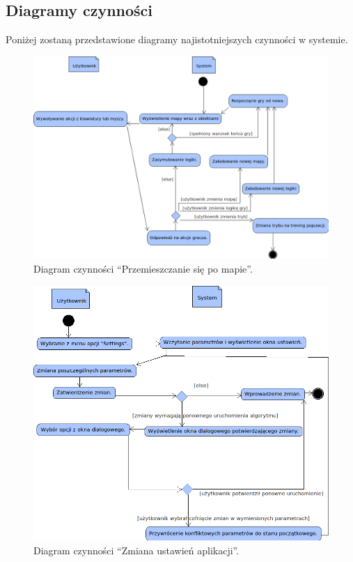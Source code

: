 \subsection{Diagramy czynności}
\begin{par}
		Poniżej zostaną przedstawione diagramy najistotniejszych czynności w systemie.
		\begin{figure}[!h]
		\centering
		\includegraphics[width=\textwidth]{obrazki/activity_diagram.png}
		\caption{Diagram czynności ``Przemieszczanie się po mapie''.}
		\label{fig:activ1}
		\end{figure}
		\begin{figure}[!h]
		\centering
		\includegraphics[width=\textwidth]{obrazki/activity_diagram_2.png}
		\caption{Diagram czynności ``Zmiana ustawień aplikacji''.}
		\label{fig:activ2}
		\end{figure}
		\FloatBarrier
\end{par}
